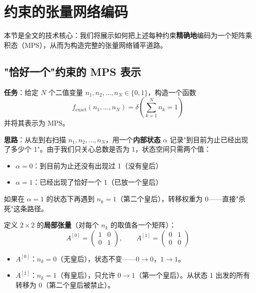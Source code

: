 \documentclass[12pt,a4paper]{ctexart}
\begin{document}
\section{约束的张量网络编码}

本节是全文的技术核心：我们将展示如何把上述每种约束\textbf{精确地}编码为一个矩阵乘积态（MPS），从而为构造完整的张量网络铺平道路。

\subsection{"恰好一个"约束的 MPS 表示}

\textbf{任务}：给定 $N$ 个二值变量 $n_1, n_2, \ldots, n_N \in \{0, 1\}$，构造一个函数
\[
f_{\text{exact}}(n_1, \ldots, n_N) = \delta\!\left(\sum_{k=1}^N n_k = 1\right)
\]
并将其表示为 MPS。

\textbf{思路}：从左到右扫描 $n_1, n_2, \ldots, n_N$，用一个\textbf{内部状态} $\alpha$ 记录"到目前为止已经出现了多少个 1"。由于我们只关心总数是否为 1，状态空间只需两个值：

\begin{itemize}
    \item $\alpha = 0$：到目前为止还没有出现过 1（没有皇后）
    \item $\alpha = 1$：已经出现了恰好一个 1（已放一个皇后）
\end{itemize}

如果在 $\alpha = 1$ 的状态下再遇到 $n_k = 1$（第二个皇后），转移权重为 0——直接"杀死"这条路径。

定义 $2 \times 2$ 的\textbf{局部张量}（对每个 $n_k$ 的取值各一个矩阵）：
\begin{equation}
\boxed{
A^{[0]} = \begin{pmatrix} 1 & 0 \\ 0 & 1 \end{pmatrix}, \qquad
A^{[1]} = \begin{pmatrix} 0 & 1 \\ 0 & 0 \end{pmatrix}
}
\end{equation}

\begin{itemize}
    \item $A^{[0]}$：$n_k = 0$（无皇后），状态不变——$0 \to 0$，$1 \to 1$。
    \item $A^{[1]}$：$n_k = 1$（有皇后），只允许 $0 \to 1$（第一个皇后）。从状态 1 出发的所有转移为 0（第二个皇后被禁止）。
\end{itemize}
\end{document}
